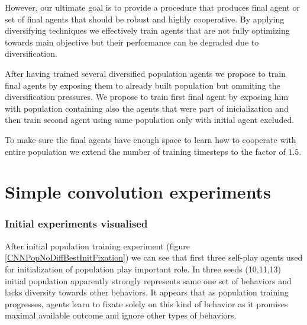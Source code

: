 However, our ultimate goal is to provide a procedure that produces final agent or set of final agents that should be robust and highly cooperative.
By applying diversifying techniques we effectively train agents that are not fully optimizing towards main objective but their performance can be degraded due to diversification. 

After having trained several diversified population agents we propose to train final agents by exposing them to already built population but ommiting the diversification pressures.
We propose to train first final agent by exposing him with population containing also the agents that were part of inicialization
and then train second agent using same population only with initial agent excluded.

To make sure the final agents have enough space to learn how to cooperate with entire population we extend the number of training timesteps to the factor of $1.5$.


\section{Simple convolution experiments}

\subsubsection{Initial experiments visualised}

After initial population training experiment (figure \ref{CNNPopNoDiffBestInitFixation}) we can see that first three self-play agents used for initialization of population play important role.
In three seeds (10,11,13) initial population apparently strongly represents same one set of behaviors and lacks diversity towards other behaviors.
It appears that as population training progresses, agents learn to fixate solely on this kind of behavior as it promises maximal available outcome and ignore other types of behaviors.

